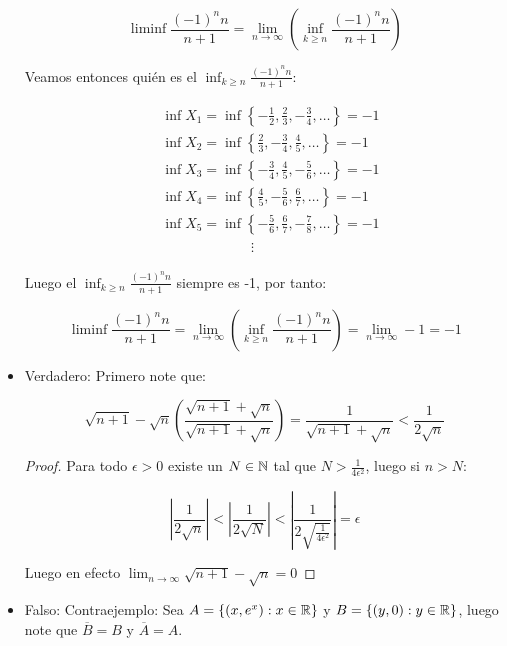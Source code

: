 \begin{itemize}[label={✎},leftmargin=*]
        $$\liminf \frac{(-1)^n n}{n+1}=\lim _{n \rightarrow \infty}\left(\inf_{k \geq n} \frac{(-1)^nn}{n+1}\right)$$

        Veamos entonces quién es el $\inf_{k\geq n} \frac{(-1)^nn}{n+1}$:

        \begin{align*}
            &\inf X_1=\inf \left\{-\frac{1}{2},\frac{2}{3},-\frac{3}{4},\ldots\right\}=-1\\
            &\inf X_2=\inf \left\{\frac{2}{3},-\frac{3}{4},\frac{4}{5},\ldots\right\}=-1\\
            &\inf X_3=\inf \left\{-\frac{3}{4},\frac{4}{5},-\frac{5}{6},\ldots\right\}=-1\\
            &\inf X_4=\inf \left\{\frac{4}{5},-\frac{5}{6},\frac{6}{7},\ldots\right\}=-1\\
            &\inf X_5=\inf \left\{-\frac{5}{6},\frac{6}{7},-\frac{7}{8},\ldots\right\}=-1\\
            & \mathrel{\phantom{=askaldfjasl}}\vdots
        \end{align*}

        Luego el $\inf_{k\geq n} \frac{(-1)^nn}{n+1}$ siempre es -1, por tanto:

        $$\liminf \frac{(-1)^n n}{n+1}=\lim _{n \rightarrow \infty}\left(\inf_{k \geq n} \frac{(-1)^nn}{n+1}\right)=\lim_{n \to \infty} -1=-1$$




    \item Verdadero: Primero note que:

    $$\sqrt{n+1}-\sqrt{n} \left(\frac{\sqrt{n+1}+\sqrt{n}  }{\sqrt{n+1}+\sqrt{n} } \right)=\frac{1}{\sqrt{n+1}+\sqrt{n}}<\frac{1}{2\sqrt{n}}$$


    \begin{proof}
    
    Para todo $\epsilon>0$ existe un  $N\in  \mathbb{N}$ tal que $N>\frac{1}{4\epsilon^2}$, luego si $n>N$:

        $$\left|\frac{1}{2\sqrt{n} }\right|<\left|\frac{1}{2\sqrt{N} }\right|<\left|\frac{1}{2\sqrt{\frac{1}{4\epsilon^2}} }\right|=\epsilon$$


Luego en efecto $\lim_{n \to \infty} \sqrt{n+1}-\sqrt{n}=0   $
    \end{proof}

    

    \item Falso: Contraejemplo: Sea $A=\{(x,e^x) : x\in \mathbb{R}\}$ y $B=\{(y,0): y\in \mathbb{R}\}$, luego note que $\overline{B}=B$ y $\overline{A}=A$.


\end{itemize}
